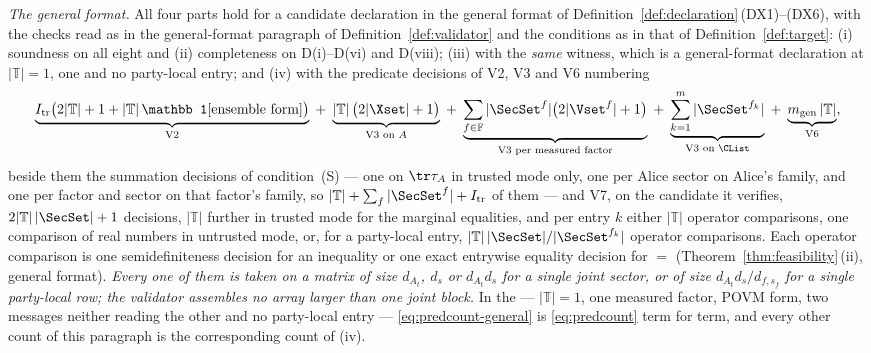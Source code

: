 \begin{theorem}
\emph{The general format.} All four parts hold for a candidate declaration in
the general format of Definition~\ref{def:declaration}\,(DX1)--(DX6), with the
checks read as in the general-format paragraph of
Definition~\ref{def:validator} and the conditions as in that of
Definition~\ref{def:target}: (i) soundness on all eight and (ii) completeness
on D(i)--D(vi) and D(viii); (iii) with the \emph{same} witness, which is a
general-format declaration at $|\mathbb{T}|=1$, one  and
no party-local entry; and (iv) with the predicate decisions of V2, V3 and V6
numbering
\begin{equation}\label{eq:predcount-general}
  \underbrace{I_{\mathrm{tr}}\big(2|\mathbb{T}|+1
    +|\mathbb{T}|\,\mathbb 1[\text{ensemble form}]\big)}_{\text{V2}}
  \;+\;\underbrace{|\mathbb{T}|\,\big(2|\Xset|+1\big)}_{\text{V3 on }A}
  \;+\;\underbrace{\sum_{f\in\mathbb{F}}|\SecSet^{f}|
    \big(2|\Vset^{f}|+1\big)}_{\text{V3 per measured factor}}
  \;+\;\underbrace{\sum_{k=1}^{m}|\SecSet^{f_k}|}_{\text{V3 on }\CList}
  \;+\;\underbrace{m_{\text{gen}}\,|\mathbb{T}|}_{\text{V6}} ,
\end{equation}
beside them the summation decisions of condition~(S) --- one on
$\tr\tau_A$ in trusted mode only, one per Alice sector on Alice's family,
and one per factor and sector on that factor's family, so
$|\mathbb{T}|+\sum_f|\SecSet^{f}|+I_{\mathrm{tr}}$ of them --- and V7, on the
candidate it verifies, $2|\mathbb{T}|\,|\SecSet|+1$ decisions, $|\mathbb{T}|$
further in trusted mode for the marginal equalities, and per entry $k$ either
$|\mathbb{T}|$ operator comparisons, one comparison of real numbers in
untrusted mode, or, for a party-local entry,
$|\mathbb{T}|\,|\SecSet|/|\SecSet^{f_k}|$ operator comparisons.
Each operator comparison is one semidefiniteness decision for an inequality
or one exact entrywise equality decision for $=$
(Theorem~\ref{thm:feasibility}\,(ii), general format). \emph{Every one of them is
taken on a matrix of size $d_{A_t}$, $d_s$ or $d_{A_t}d_s$ for a single joint
sector, or of size $d_{A_t}d_s/d_{f,s_f}$ for a single party-local row;
the validator assembles no array larger than one joint block.} In the
 --- $|\mathbb{T}|=1$, one measured factor, POVM form, two
messages neither reading the other and no party-local entry ---
\eqref{eq:predcount-general} is
\eqref{eq:predcount} term for term, and every other count of this paragraph is
the corresponding count of (iv).
\end{theorem}

